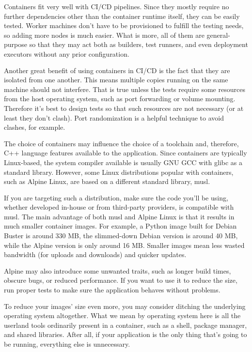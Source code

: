 
Containers fit very well with CI/CD pipelines. Since they mostly require no further dependencies other than the container runtime itself, they can be easily tested. Worker machines don't have to be provisioned to fulfill the testing needs, so adding more nodes is much easier. What is more, all of them are general-purpose so that they may act both as builders, test runners, and even deployment executors without any prior configuration.

Another great benefit of using containers in CI/CD is the fact that they are isolated from one another. This means multiple copies running on the same machine should not interfere. That is true unless the tests require some resources from the host operating system, such as port forwarding or volume mounting. Therefore it's best to design tests so that such resources are not necessary (or at least they don't clash). Port randomization is a helpful technique to avoid clashes, for example.


The choice of containers may influence the choice of a toolchain and, therefore, C++ language features available to the application. Since containers are typically Linux-based, the system compiler available is usually GNU GCC with glibc as a standard library. However, some Linux distributions popular with containers, such as Alpine Linux, are based on a different standard library, musl.

If you are targeting such a distribution, make sure the code you'll be using, whether developed in-house or from third-party providers, is compatible with musl. The main advantage of both musl and Alpine Linux is that it results in much smaller container images. For example, a Python image built for Debian Buster is around 330 MB, the slimmed-down Debian version is around 40 MB, while the Alpine version is only around 16 MB. Smaller images mean less wasted bandwidth (for uploads and downloads) and quicker updates.

Alpine may also introduce some unwanted traits, such as longer build times, obscure bugs, or reduced performance. If you want to use it to reduce the size, run proper tests to make sure the application behaves without problems.

To reduce your images' size even more, you may consider ditching the underlying operating system altogether. What we mean by operating system here is all the userland tools ordinarily present in a container, such as a shell, package manager, and shared libraries. After all, if your application is the only thing that's going to be running, everything else is unnecessary.

